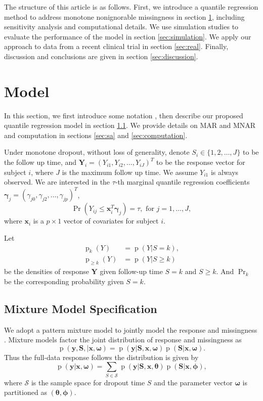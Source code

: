 \documentclass[12pt]{article}
\DeclareMathOperator{\pr}{p}
\DeclareMathOperator{\prob}{Pr}
\begin{document}
The structure of this article is as follows. First, we introduce a
quantile regression method to address monotone nonignorable
missingness in section \ref{sec:model}, including sensitivity analysis
and computational details.  We use simulation studies to evaluate the
performance of the model in section \ref{sec:simulation}. We apply our
approach to data from a recent clinical trial in section
\ref{sec:real}. Finally, discussion and conclusions are given in
section \ref{sec:discussion}.

\section{Model}
\label{sec:model}

In this section, we first introduce some notation
, then describe our proposed quantile regression model in
section \ref{sec:settings}. We provide details on MAR and MNAR
and computation in sections \ref{sec:sa} and \ref{sec:computation}.

Under monotone dropout, without loss of generality, denote $S_i \in
\{1, 2, \ldots, J\}$ to be the follow up time, and $\bm Y_i = (Y_{i1},
Y_{i2}, \ldots, Y_{iJ})^{T}$ to be the response vector for subject
$i$, where $J$ is the maximum follow up time. We assume $Y_{i1}$ is
always observed. We are interested in the $\tau$-th marginal quantile
regression coefficients $\bm \gamma_j = (\gamma_{j0}, \gamma_{j2},
\ldots, \gamma_{jp})^T$,
\begin{equation}
  \label{eq:quantile}
  \prob (Y_{ij} \leq \bm x_i^{T} \bm \gamma_j ) = \tau, \text{ for } j = 1, \ldots, J,
\end{equation}
where $\bm x_i$ is a $p \times 1$ vector of covariates for subject $i$.

Let
\begin{align*}
  \pr_k(Y) &= \pr (Y | S = k), \\
  \pr_{\geq k} (Y) & = \pr (Y | S \geq k)
\end{align*}
be the densities of response $\bm Y$ given follow-up time $S=k$ and $S
\geq k$. And $\prob_k$ be the corresponding probability given $S = k$.

\subsection{Mixture Model Specification}
\label{sec:settings}
We adopt a pattern mixture model to jointly model the response and
missingness \citep{little1994, dh2008}. Mixture models factor the
joint distribution of response and missingness as
\begin{displaymath}
  \pr (\bm y, \bm S, |\bm x, \bm \omega) = \pr (\bm y|\bm S, \bm x, \bm \omega) \pr (\bm S | \bm x, \bm \omega).
\end{displaymath}
Thus the full-data response follows the distribution is given by
\begin{displaymath}
  \pr (\bm y | \bm x, \bm \omega) = \sum_{S \in \mathcal{S}} \pr(\bm y| \bm S, \bm x, \bm \theta) \pr (\bm S | \bm x, \bm \phi),
\end{displaymath}
where $\mathcal{S}$ is the sample space for dropout time $S$ and the
parameter vector $\bm \omega$ is partitioned as $(\bm \theta, \bm
\phi)$.
\end{document}
